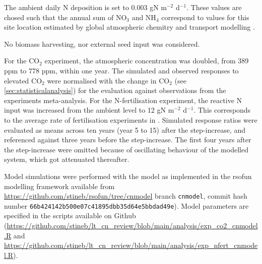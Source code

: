 \documentclass{myreport}
\begin{document}
The ambient daily N deposition is set to 0.003 gN m$^{-2}$ d$^{-1}$. These values are chosed such that the annual sum of NO$_3$ and NH$_4$ correspond to values for this site location estimated by global atmospheric chemitry and transport modelling \citep{lamarque_global_2011}.

No biomass harvesting, nor external seed input was considered.

For the CO$_2$ experiment, the atmospheric concentration was doubled, from 389 ppm to 778 ppm, within one year. The simulated and observed responses to elevated CO$_2$ were normalised with the change in CO$_2$ (see \ref{sec:statisticalanalysis}) for the evaluation against observations from the experiments meta-analysis. For the N-fertilisation experiment, the reactive N input was increased from the ambient level to 12 gN m$^{-2}$ d$^{-1}$. This corresponds to the average rate of fertilisation experiments in \citep{liang_global_2020}. Simulated response ratios were evaluated as means across ten years (year 5 to 15) after the step-increase, and referenced against three years before the step-increase. The first four years after the step-increase were omitted because of oscillating behaviour of the modelled system, which got attenuated thereafter.

Model simulations were performed with the model as implemented in the {rsofun} modelling framework available from \url{https://github.com/stineb/rsofun/tree/cnmodel} branch \texttt{cnmodel}, commit hash number \texttt{66b424142b500e07c41895dbb35d64e5bbdad49e}). Model parameters are specified in the scripts available on Github (\url{https://github.com/stineb/lt_cn_review/blob/main/analysis/exp_co2_cnmodel.R} and \url{https://github.com/stineb/lt_cn_review/blob/main/analysis/exp_nfert_cnmodel.R}).

\clearpage

\end{document}
